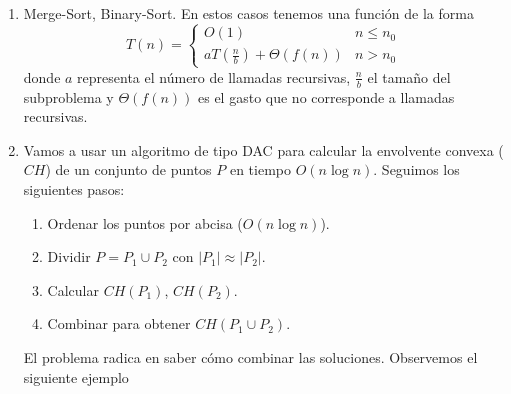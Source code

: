 \documentclass[AL.tex]{subfiles}
\begin{document}
\begin{ejs}\
\begin{enumerate}
\item Merge-Sort, Binary-Sort. En estos casos tenemos una función de la forma
\[
 T(n)=\begin{cases}
 O(1) & n\leq n_0\\
 aT\left(\frac{n}{b}\right)+\Theta(f(n)) & n>n_0
 \end{cases}
\]
donde $a$ representa el número de llamadas recursivas, $\frac{n}{b}$ el tamaño del subproblema y $\Theta(f(n))$ es el gasto que no corresponde a llamadas recursivas.
\item Vamos a usar un algoritmo de tipo DAC para calcular la envolvente convexa ($CH$) de un conjunto de puntos $P$ en tiempo $O(n\log n)$. Seguimos los siguientes pasos:
\begin{enumerate}
\item Ordenar los puntos por abcisa ($O(n\log n)$).
\item Dividir $P=P_1\cup P_2$ con $|P_1|\approx|P_2|$.
\item Calcular $CH(P_1)$, $CH(P_2)$.
\item Combinar para obtener $CH(P_1\cup P_2)$. 
\end{enumerate}

El problema radica en saber cómo combinar las soluciones. Observemos el siguiente ejemplo 


\end{enumerate}
\end{ejs}
\end{document}

